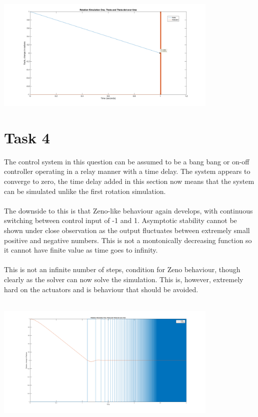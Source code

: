 \documentclass[a4paper,12pt,oneside,onecolumn]{article} %
\begin{document}
 \begin{center}
  \includegraphics[width = 0.8\textwidth]{q3plot}
 \end{center}

 
\section*{Task 4}

The control system in this question can be assumed
to be a bang bang or on-off controller operating in a relay manner with a time delay. The system appears to converge to zero, the time delay added in this section now means that the system can be simulated unlike the first rotation simulation.\\
\\

The downside to this is that Zeno-like behaviour again develops, with continuous switching between control
input of -1 and 1. Asymptotic stability cannot be shown under close observation as the output fluctuates between extremely small positive and negative numbers. This is not a montonically decreasing function so it cannot have finite value as time goes to infinity.\\
\\

This is not an infinite number of steps, condition for Zeno behaviour, though clearly as the solver can now solve the simulation. This is, however, extremely hard on the actuators and is behaviour that should be avoided.\\
\\

 \begin{center}
  \includegraphics[width = 0.8\textwidth]{q4plot}
 \end{center}
\end{document}
